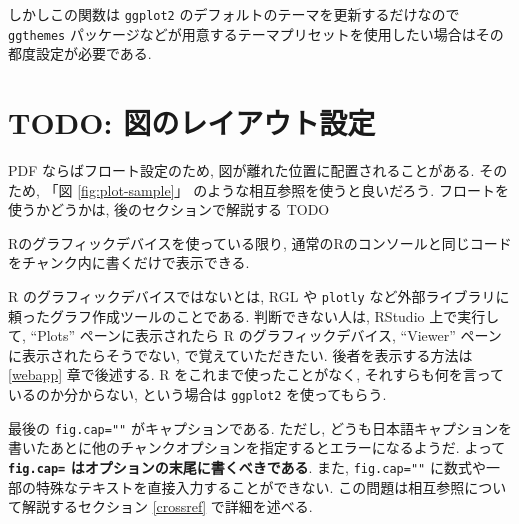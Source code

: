 \documentclass[
  xelatex,ja=standard,jafont=noto]{bxjsbook}
\newenvironment{Shaded}{\begin{snugshade}}{\end{snugshade}}
\newcommand{\AttributeTok}[1]{\textcolor[rgb]{0.77,0.63,0.00}{#1}}
\newcommand{\FunctionTok}[1]{\textcolor[rgb]{0.00,0.00,0.00}{#1}}
\newcommand{\NormalTok}[1]{#1}
\newcommand{\SpecialCharTok}[1]{\textcolor[rgb]{0.00,0.00,0.00}{#1}}
\theoremstyle{definition}
\theoremstyle{definition}
\theoremstyle{definition}
\theoremstyle{definition}
\theoremstyle{remark}
\begin{document}
しかしこの関数は \texttt{ggplot2}
のデフォルトのテーマを更新するだけなので \texttt{ggthemes}
パッケージなどが用意するテーマプリセットを使用したい場合はその都度設定が必要である.

\begin{Shaded}
\end{Shaded}

\hypertarget{todo-ux56f3ux306eux30ecux30a4ux30a2ux30a6ux30c8ux8a2dux5b9a}{%
\section{TODO:
図のレイアウト設定}\label{todo-ux56f3ux306eux30ecux30a4ux30a2ux30a6ux30c8ux8a2dux5b9a}}

PDF ならばフロート設定のため, 図が離れた位置に配置されることがある.
そのため, 「図 \ref{fig:plot-sample}」
のような相互参照を使うと良いだろう. フロートを使うかどうかは,
後のセクションで解説する TODO

Rのグラフィックデバイスを使っている限り,
通常のRのコンソールと同じコードをチャンク内に書くだけで表示できる.

R のグラフィックデバイスではないとは, RGL や \texttt{plotly}
など外部ライブラリに頼ったグラフ作成ツールのことである.
判断できない人は, RStudio 上で実行して, ``Plots'' ペーンに表示されたら R
のグラフィックデバイス, ``Viewer'' ペーンに表示されたらそうでない,
で覚えていただきたい. 後者を表示する方法は \ref{webapp} 章で後述する. R
をこれまで使ったことがなく, それすらも何を言っているのか分からない,
という場合は \texttt{ggplot2} を使ってもらう.

最後の \texttt{fig.cap=""} がキャプションである. ただし,
どうも日本語キャプションを書いたあとに他のチャンクオプションを指定するとエラーになるようだ.
よって \textbf{\texttt{fig.cap=} はオプションの末尾に書くべきである}.
また, \texttt{fig.cap=""}
に数式や一部の特殊なテキストを直接入力することができない.
この問題は相互参照について解説するセクション \ref{crossref}
で詳細を述べる.
\end{document}
